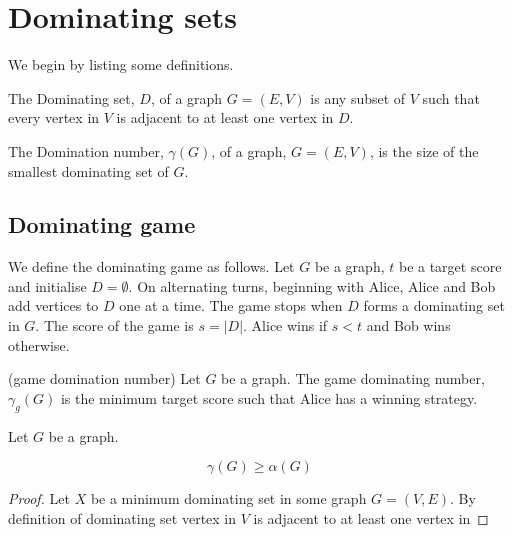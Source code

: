 \chapter{Dominating sets}\label{sec:domSet}

We begin by listing some definitions.

\begin{definition}
    The Dominating set, $D$, of a graph $G=(E,V)$ is any subset of $V$ such that every vertex in $V$ is adjacent to at least one vertex in $D$.
\end{definition}

\begin{definition}
    The Domination number, $\gamma(G)$, of a graph, $G=(E,V)$, is the size of the smallest dominating set of $G$.
\end{definition}


\section{Dominating game}


We define the dominating game as follows. Let $G$ be a graph, $t$ be a target score and initialise $D=\emptyset$. On alternating turns, beginning with Alice, Alice and Bob add vertices to $D$ one at a time. The game stops when $D$ forms a dominating set in $G$. The score of the game is $s=|D|$. Alice wins if $s<t$ and Bob wins otherwise.

\begin{definition}(game domination number)
    Let $G$ be a graph. The game dominating number, $\gamma_g(G)$ is the minimum target score such that Alice has a winning strategy.
\end{definition} 

\begin{lemma}
    Let $G$ be a graph. 
        
    \[\gamma(G) \geq \alpha(G)\]
\end{lemma}

\begin{proof}
    Let $X$ be a minimum dominating set in some graph $G=(V,E)$. By definition of dominating set vertex in $V$ is adjacent to at least one vertex in      
\end{proof}
    
